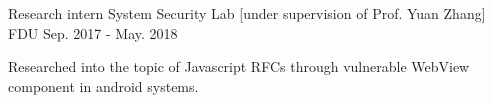 \begin{cventries}
  \cventry
    {Research intern} %
    {System Security Lab [under supervision of Prof. Yuan Zhang]} %
    {FDU} %
    {Sep. 2017 - May. 2018} %
    {
      \begin{cvitems} %
        \item {Researched into the topic of Javascript RFCs through vulnerable WebView component in android systems.}
      \end{cvitems}
    }

\end{cventries}
